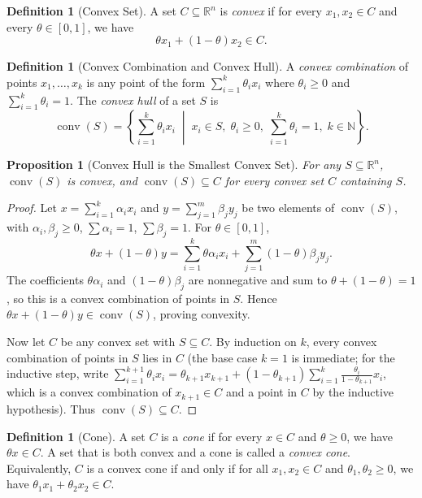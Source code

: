 \documentclass[11pt,a4paper]{article}
\newtheorem{proposition}[theorem]{Proposition}
\theoremstyle{definition}
\newtheorem{definition}[theorem]{Definition}
\theoremstyle{remark}
\newcommand{\R}{\mathbb{R}}
\newcommand{\N}{\mathbb{N}}
\DeclareMathOperator{\conv}{conv}
\begin{document}
\begin{definition}[Convex Set]
\label{def:convex-set}
A set $C \subseteq \R^n$ is \emph{convex} if for every $x_1, x_2 \in C$ and every
$\theta \in [0,1]$, we have
\[
  \theta x_1 + (1-\theta) x_2 \in C.
\]
\end{definition}

\begin{definition}[Convex Combination and Convex Hull]
\label{def:convex-hull}
A \emph{convex combination} of points $x_1, \ldots, x_k$ is any point of the form
$\sum_{i=1}^k \theta_i x_i$ where $\theta_i \ge 0$ and $\sum_{i=1}^k \theta_i = 1$.
The \emph{convex hull} of a set $S$ is
\[
  \conv(S) = \left\{ \sum_{i=1}^k \theta_i x_i \;\middle|\;
    x_i \in S, \; \theta_i \ge 0, \;
    \sum_{i=1}^k \theta_i = 1, \; k \in \N \right\}.
\]
\end{definition}

\begin{proposition}[Convex Hull is the Smallest Convex Set]
\label{prop:convex-hull-smallest}
For any $S \subseteq \R^n$, $\conv(S)$ is convex, and $\conv(S) \subseteq C$ for every
convex set $C$ containing $S$.
\end{proposition}

\begin{proof}
Let $x = \sum_{i=1}^k \alpha_i x_i$ and $y = \sum_{j=1}^m \beta_j y_j$ be two elements
of $\conv(S)$, with $\alpha_i, \beta_j \ge 0$, $\sum \alpha_i = 1$, $\sum \beta_j = 1$.
For $\theta \in [0,1]$,
\[
  \theta x + (1-\theta) y = \sum_{i=1}^k \theta \alpha_i x_i
    + \sum_{j=1}^m (1-\theta) \beta_j y_j.
\]
The coefficients $\theta \alpha_i$ and $(1-\theta)\beta_j$ are nonnegative and sum to
$\theta + (1-\theta) = 1$, so this is a convex combination of points in $S$. Hence
$\theta x + (1-\theta)y \in \conv(S)$, proving convexity.

Now let $C$ be any convex set with $S \subseteq C$. By induction on $k$, every convex
combination of points in $S$ lies in $C$ (the base case $k=1$ is immediate; for the
inductive step, write $\sum_{i=1}^{k+1} \theta_i x_i = \theta_{k+1} x_{k+1} +
(1-\theta_{k+1}) \sum_{i=1}^k \frac{\theta_i}{1-\theta_{k+1}} x_i$, which is a convex
combination of $x_{k+1} \in C$ and a point in $C$ by the inductive hypothesis). Thus
$\conv(S) \subseteq C$.
\end{proof}

\begin{definition}[Cone]
\label{def:cone}
A set $C$ is a \emph{cone} if for every $x \in C$ and $\theta \ge 0$, we have
$\theta x \in C$. A set that is both convex and a cone is called a \emph{convex cone}.
Equivalently, $C$ is a convex cone if and only if for all $x_1, x_2 \in C$ and
$\theta_1, \theta_2 \ge 0$, we have $\theta_1 x_1 + \theta_2 x_2 \in C$.
\end{definition}
\end{document}
